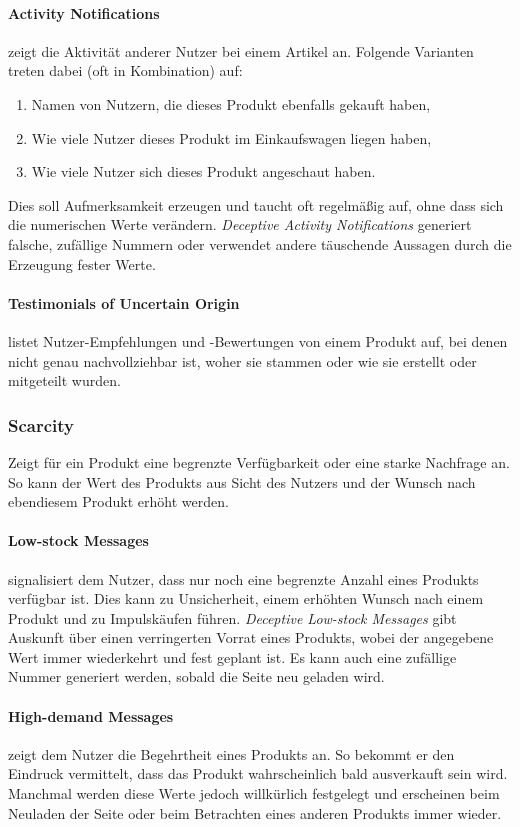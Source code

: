 \documentclass[a4paper]{article}
\begin{document}
\paragraph{Activity Notifications} zeigt die Aktivität anderer Nutzer bei einem Artikel an. Folgende Varianten treten dabei (oft in Kombination) auf: 
\begin{enumerate}[label=\arabic*)]
	\item{Namen von Nutzern, die dieses Produkt ebenfalls gekauft haben,}
	\item{Wie viele Nutzer dieses Produkt im Einkaufswagen liegen haben,}
	\item{Wie viele Nutzer sich dieses Produkt angeschaut haben.}
\end{enumerate}
Dies soll Aufmerksamkeit erzeugen und taucht oft regelmäßig auf, ohne dass sich die numerischen Werte verändern. \textit{Deceptive Activity Notifications} generiert falsche, zufällige Nummern oder verwendet andere täuschende Aussagen durch die Erzeugung fester Werte.

\paragraph{Testimonials of Uncertain Origin} listet Nutzer-Empfehlungen und -Bewertungen von einem Produkt auf, bei denen nicht genau nachvollziehbar ist, woher sie stammen oder wie sie erstellt oder mitgeteilt wurden. 

\subsubsection{Scarcity}
Zeigt für ein Produkt eine begrenzte Verfügbarkeit oder eine starke Nachfrage an. So kann der Wert des Produkts aus Sicht des Nutzers und der Wunsch nach ebendiesem Produkt erhöht werden.

\paragraph{Low-stock Messages} signalisiert dem Nutzer, dass nur noch eine begrenzte Anzahl eines Produkts verfügbar ist. Dies kann zu Unsicherheit, einem erhöhten Wunsch nach einem Produkt und zu Impulskäufen führen. \textit{Deceptive Low-stock Messages} gibt Auskunft über einen verringerten Vorrat eines Produkts, wobei der angegebene Wert immer wiederkehrt und fest geplant ist. Es kann auch eine zufällige Nummer generiert werden, sobald die Seite neu geladen wird. 

\paragraph{High-demand Messages} zeigt dem Nutzer die Begehrtheit eines Produkts an. So bekommt er den Eindruck vermittelt, dass das Produkt wahrscheinlich bald ausverkauft sein wird. Manchmal werden diese Werte jedoch willkürlich festgelegt und erscheinen beim Neuladen der Seite oder beim Betrachten eines anderen Produkts immer wieder.
\end{document}

